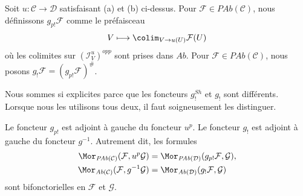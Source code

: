 \begin{definition}
\label{definition-g-shriek}
Soit $u : \mathcal{C} \to \mathcal{D}$ satisfaisant (a) et (b) ci-dessus. Pour
$\mathcal{F} \in \textit{PAb}(\mathcal{C})$, nous définissons
{\it $g_{p!}\mathcal{F}$} comme le préfaisceau
$$
V \longmapsto \colim_{V \to u(U)} \mathcal{F}(U)
$$
où les colimites sur $(\mathcal{I}_V^u)^{opp}$ sont prises dans
$\textit{Ab}$. Pour $\mathcal{F} \in \textit{PAb}(\mathcal{C})$, nous posons
{\it $g_!\mathcal{F} = (g_{p!}\mathcal{F})^\#$}.
\end{definition}

\noindent
Nous sommes si explicites parce que les foncteurs $g^{Sh}_!$ et $g_!$ sont
différents. Lorsque nous les utilisons tous deux, il faut soigneusement les
distinguer.

\begin{lemma}
\label{lemma-g-shriek-adjoint}
Le foncteur $g_{p!}$ est adjoint à gauche du foncteur $u^p$. Le foncteur $g_!$
est adjoint à gauche du foncteur $g^{-1}$. Autrement dit, les formules
\begin{align*}
\Mor_{\textit{PAb}(\mathcal{C})}(\mathcal{F}, u^p\mathcal{G})
& =
\Mor_{\textit{PAb}(\mathcal{D})}(g_{p!}\mathcal{F}, \mathcal{G}), \\
\Mor_{\textit{Ab}(\mathcal{C})}(\mathcal{F}, g^{-1}\mathcal{G})
& =
\Mor_{\textit{Ab}(\mathcal{D})}(g_!\mathcal{F}, \mathcal{G})
\end{align*}
sont bifonctorielles en $\mathcal{F}$ et $\mathcal{G}$.
\end{lemma}

